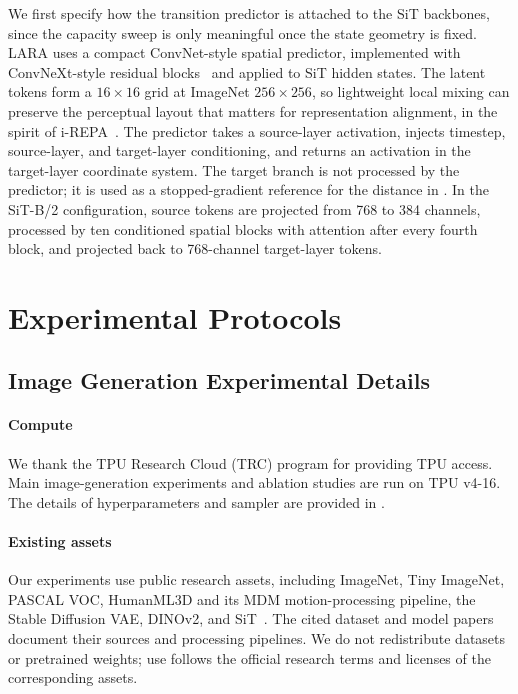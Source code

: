 We first specify how the transition predictor is attached to the SiT backbones, since the capacity sweep is only meaningful once the state geometry is fixed. LARA uses a compact ConvNet-style spatial predictor, implemented with ConvNeXt-style residual blocks~\citep{liu2022convnext} and applied to SiT hidden states. The latent tokens form a $16{\times}16$ grid at ImageNet $256{\times}256$, so lightweight local mixing can preserve the perceptual layout that matters for representation alignment, in the spirit of i-REPA~\citep{singh2025irepa}. The predictor takes a source-layer activation, injects timestep, source-layer, and target-layer conditioning, and returns an activation in the target-layer coordinate system. The target branch is not processed by the predictor; it is used as a stopped-gradient reference for the distance in . In the SiT-B/2 configuration, source tokens are projected from 768 to 384 channels, processed by ten conditioned spatial blocks with attention after every fourth block, and projected back to 768-channel target-layer tokens.

\section{Experimental Protocols}
\label{app:experimental_details}

\subsection{Image Generation Experimental Details}
\label{app:image_generation_details}

\paragraph{Compute}
We thank the TPU Research Cloud (TRC) program for providing TPU access. Main image-generation experiments and ablation studies are run on TPU v4-16. The details of hyperparameters and sampler are provided in .

\paragraph{Existing assets}
Our experiments use public research assets, including ImageNet, Tiny ImageNet, PASCAL VOC, HumanML3D and its MDM motion-processing pipeline, the Stable Diffusion VAE, DINOv2, and SiT~\citep{deng2009imagenet,everingham2010pascal,guo2022generating,tevet2022mdm,rombach2022ldm,oquab2023dinov2,ma2024sit}. The cited dataset and model papers document their sources and processing pipelines. We do not redistribute datasets or pretrained weights; use follows the official research terms and licenses of the corresponding assets.

